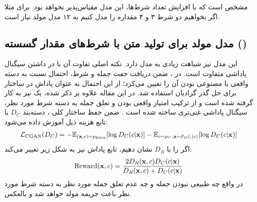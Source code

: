 مشخص است که با افزایش تعداد شرط‌ها، این مدل مقیاس‌پذیر نخواهد بود. برای مثلا اگر بخواهیم دو شرط ۳ و ۴ مقداره را مدل کنیم به ۱۲ مدل مولد نیاز است.
\subsection{
    مدل مولد برای تولید متن با شرط‌های مقدار گسسته
()\protect{}}
این مدل نیز شباهت زیادی به مدل \cgan{} دارد. نکته اصلی تفاوت آن با \cgan{} در داشتن سیگنال پاداشی متفاوت است. در \cgan{}،
\discriminator{}
ضمن دریافت جفت جمله و شرط، احتمال نسبت به دسته واقعی یا مصنوعی بودن آن را تعیین می‌کرد؛ از این احتمال به عنوان پاداش در ساختار \reinforce{} برای حل گذر گرادیان استفاده شد. در این مقاله علاوه بر \discriminator{} ذکر شده، یک \classifier{} نیز به کار گرفته شده است و از ترکیب امتیاز واقعی بودن و تعلق جمله به دسته شرط مورد نظر، سیگنال پاداشی غنی‌تری ساخته شده است \cite{csgan}. ضمن حفظ ساختار کلی \cgan{}، دسته‌بند $D_C$ با تابع هزینه ذیل آموزش داده می‌شود:
\begin{align}
	{\mathcal{L}}_\text{CGAN} (D_C) =
	-\mathbb E_{({\bf x}, c) \sim p_\text{Data}} [\log D_C(c|{\bf x})]
	-\mathbb E_{c \sim p_C, {\bf x} \sim \mathbb P_G(.|c)} [\log D_C(c|{\bf x})]
\end{align}
اگر \discriminator{} را با $D_R$ نشان دهیم، تابع پاداش نیز به شکل زیر تغییر می‌کند:
\begin{align}
	\text{Reward} ({\bf x}, c) =
	\frac{2 D_R({\bf x},c)D_C(c|{\bf x})}
	{D_R({\bf x},c) + D_C(c|{\bf x})}
\end{align}
در واقع چه طبیعی نبودن جمله و چه عدم تعلق جمله مورد نظر به دسته شرط مورد نظر باعث جریمه مولد خواهد شد و بالعکس.
